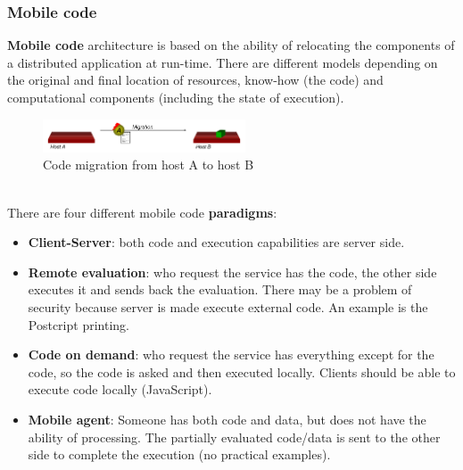 \documentclass[10pt,a4paper]{article}
\begin{document}
\subsubsection{Mobile code}
\textbf{Mobile code} architecture is based on the ability of relocating the components of a distributed application at run-time. There are different models depending on the original and final location of resources, know-how (the code) and computational components (including the state of execution).
\begin{figure}[h!]
 \hfill \includegraphics[width=170pt]{images/mobile-code.png}\hspace*{\fill}
  \caption{Code migration from host A to host B}
  \label{fig:mobilecode}
\end{figure} \\
There are four different mobile code \textbf{paradigms}:
\begin{itemize}
	\item \textbf{Client-Server}: both code and execution capabilities are server side.
	\item \textbf{Remote evaluation}: who request the service has the code, the other side executes it and sends back the evaluation. There may be a problem of security because server is made execute external code. An example is the Postcript printing.
	\item \textbf{Code on demand}: who request the service has everything except for the code, so the code is asked and then executed locally. Clients should be able to execute code locally (JavaScript).
	\item \textbf{Mobile agent}: Someone has both code and data, but does not have the ability of processing. The partially evaluated code/data is sent to the other side to complete the execution (no practical examples).
\end{itemize}
\end{document}
